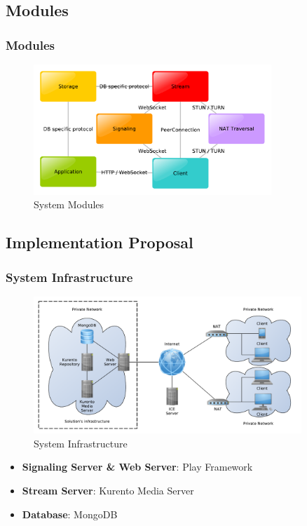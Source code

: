 \documentclass[compress]{beamer}
\begin{document}

\subsection{Modules}

	\begin{frame}[c]
		\frametitle{Modules}
		\begin{figure}[H]
			\includegraphics[width=0.8\textwidth]{figures/modules.pdf}
			\caption{System Modules}
		\end{figure}
	\end{frame}

\subsection{Implementation Proposal}

		\begin{frame}[c]
		\frametitle{System Infrastructure}



		\begin{figure}[H]
			\includegraphics[width=0.9\textwidth]{figures/infrastructure.pdf}
			\caption{System Infrastructure}
		\end{figure}

\begin{itemize}
		\item \small \textbf{Signaling Server \& Web Server}: Play Framework
		\item \textbf{Stream Server}: Kurento Media Server		
		\item \textbf{Database}: MongoDB
		\end{itemize}




		\end{frame}
\end{document}
